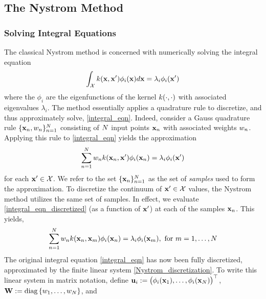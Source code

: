 \documentclass[12pt]{article}
\begin{document}
\subsection{The Nystrom Method}

\subsubsection{Solving Integral Equations}
The classical Nystrom method is concerned with numerically solving the integral equation 
\begin{align}
\int_{\mathcal{X}} k(\mathbf{x}, \mathbf{x}^\prime) \phi_i(\mathbf{x}) d\mathbf{x} = \lambda_i \phi_i(\mathbf{x}^\prime) \label{integral_eqn}
\end{align}
where the $\phi_i$ are the eigenfunctions of the kernel $k(\cdot, \cdot)$ with associated eigenvalues $\lambda_i$. The method essentially applies 
a quadrature rule to discretize, and thus approximately solve, \ref{integral_eqn}. Indeed, consider a Gauss quadrature rule 
$\{\mathbf{x}_{n}, w_{n}\}_{n = 1}^{N}$ consisting of $N$ input points $\mathbf{x}_{n}$ with associated weights $w_{n}$.
Applying this rule to \ref{integral_eqn} yields the approximation 
\begin{align}
\sum_{n = 1}^{N} w_{n} k(\mathbf{x}_{n}, \mathbf{x}^\prime) \phi_i(\mathbf{x}_{n}) = \lambda_i \phi_i(\mathbf{x}^\prime) \label{integral_eqn_discretized}
\end{align}
for each $\mathbf{x}^\prime \in \mathcal{X}$. We refer to the set $\{\mathbf{x}_{n}\}_{n = 1}^{N}$ as the set of \textit{samples} used to form the approximation. 
To discretize the continuum of $\mathbf{x}^\prime \in \mathcal{X}$ values, the Nystrom method utilizes the same set of samples. In effect, we evaluate \ref{integral_eqn_discretized}
(as a function of $\mathbf{x}^\prime$) at each of the samples $\mathbf{x}_{n}$. This yields, 
\begin{align}
\sum_{n = 1}^{N} w_{n}  k(\mathbf{x}_{n}, \mathbf{x}_m) \phi_i(\mathbf{x}_{n}) = \lambda_i \phi_i(\mathbf{x}_m), \text{ for } m = 1, \dots, N \label{Nystrom_discretization}
\end{align}
The original integral equation \ref{integral_eqn} has now been fully discretized, approximated by the finite linear system \ref{Nystrom_discretization}. To write this linear system in 
matrix notation, define $\mathbf{u}_i := \begin{pmatrix} \phi_i(\mathbf{x}_1), \dots, \phi_i(\mathbf{x}_N) \end{pmatrix}^{\top}$, $\mathbf{W} := \text{diag}\left\{w_1, \dots, w_{N} \right\}$, and 
\end{document}
